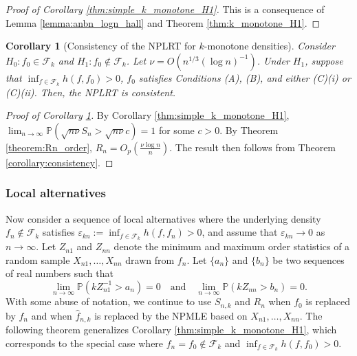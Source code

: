 \documentclass[12pt,letterpaper, twoside, openany]{article}
\theoremstyle{plain}
\newtheorem{corollary}[theorem]{Corollary}
\begin{document}
\begin{proof}[Proof of Corollary \ref{thm:simple_k_monotone_H1}]
This is a consequence of Lemma \ref{lemma:anbn_logn_hall} and Theorem \ref{thm:k_monotone_H1}.
\end{proof}


\begin{corollary}[Consistency of the NPLRT for $k$-monotone densities]\label{cor:simple_k_monotone_alt}
    Consider $H_0: f_0 \in \mathcal{F}_k$ and $H_1: f_0 \notin \mathcal{F}_k$. Let $\nu = O(n^{1/3}(\log n)^{-1})$. Under $H_1$, suppose that  $\inf_{f \in \mathcal{F}_k}h(f, f_0) > 0$, $f_0$ satisfies Conditions (A), (B), and either (C)(i) or (C)(ii). Then, the NPLRT is consistent.
    
\end{corollary}


\begin{proof}[Proof of Corollary \ref{cor:simple_k_monotone_alt}]
By Corollary \ref{thm:simple_k_monotone_H1}, $\lim_{n \rightarrow \infty} \mathbb{P}(\sqrt{n \nu} S_{n} > \sqrt{n \nu} c) = 1$ for some $c > 0$.  By Theorem \ref{theorem:Rn_order}, $R_n = O_p( \frac{\nu \log n}{n})$.  The result then follows from Theorem \ref{corollary:consistency}.
\end{proof}

\subsubsection{Local alternatives}
Now consider a sequence of local alternatives where the underlying density $f_n \notin \mathcal{F}_k$ satisfies  
$\varepsilon_{kn} := \inf_{f \in \mathcal{F}_k} h(f, f_n) > 0$, and assume that $\varepsilon_{kn} \to 0$ as $n \to \infty$.  
Let $Z_{n1}$ and $Z_{nn}$ denote the minimum and maximum order statistics of a random sample $X_{n1}, \ldots, X_{nn}$ drawn from $f_n$.  
Let $\{a_n\}$ and $\{b_n\}$ be two sequences of real numbers such that
    \begin{equation}\label{eq:a_nb_n_local}
    \lim_{n \to \infty} \mathbb{P}(k Z_{n1}^{-1} > a_{n}) = 0 \quad \text{and} \quad \lim_{n \to \infty} \mathbb{P}(k Z_{nn} > b_{n}) = 0.
\end{equation}
With some abuse of notation, we continue to use $S_{n,k}$ and $R_n$ when $f_0$ is replaced by $f_n$ and when $\hat{f}_{n,k}$ is replaced by the NPMLE based on $X_{n1}, \ldots, X_{nn}$. 
The following theorem generalizes Corollary \ref{thm:simple_k_monotone_H1}, which corresponds to the special case where $f_n = f_0 \notin \mathcal{F}_k$ and $\inf_{f \in \mathcal{F}_k} h(f, f_0) > 0$.
\end{document}
